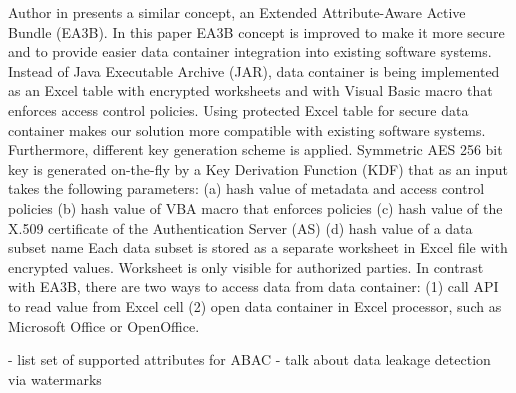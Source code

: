 \documentclass[conference]{IEEEtran}
\begin{document}
Author in \cite{c6} presents a similar concept, an Extended Attribute-Aware Active Bundle (EA3B). In this paper EA3B concept is improved to make it more secure and to provide easier data container integration into existing software systems. Instead of Java Executable Archive (JAR), data container is being implemented as an Excel table with encrypted worksheets and with Visual Basic macro that enforces access control policies. Using protected Excel table for secure data container makes our solution more compatible with existing software systems. Furthermore, different key generation scheme is applied. Symmetric AES 256 bit key is generated on-the-fly by a Key Derivation Function (KDF) that as an input takes the following parameters: 
(a) hash value of metadata and access control policies 
(b) hash value of VBA macro that enforces policies 
(c) hash value of the X.509 certificate of the Authentication Server (AS)
(d) hash value of a data subset name
Each data subset is stored as a separate worksheet in Excel file with encrypted values. Worksheet is only visible for authorized parties. In contrast with EA3B, there are two ways to access data from data container: 
(1) call API to read value from Excel cell 
(2) open data container in Excel processor, such as Microsoft Office or OpenOffice. 

- list set of supported attributes for ABAC
- talk about data leakage detection via watermarks

 
\end{document}
